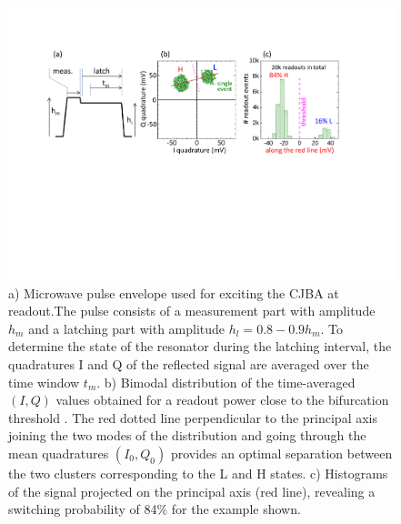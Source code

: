 \begin{figure}[ht!]
\centering
\includegraphics[width=\textwidth]{./material/figures/measurement/readout}
\caption[]{a) Microwave pulse envelope used for exciting the CJBA at readout.The pulse consists of a measurement part with amplitude $h_m$ and a latching part with amplitude $h_l=0.8-0.9h_m$. To determine the state of the resonator during the latching interval, the quadratures I and Q of the reflected signal are averaged over the time window $t_m$. b) Bimodal distribution of the time-averaged $(I,Q)$ values obtained for a readout power close to the bifurcation threshold . The red dotted line perpendicular to the principal axis joining the two modes of the distribution and going through the mean quadratures $(I_0,Q_0)$ provides an optimal separation between the two clusters corresponding to the L and H states. c) Histograms of the signal projected on the principal axis (red line), revealing a switching probability of 84\% for the  example shown.}
\label{fig:readout_bringup}
\end{figure}



